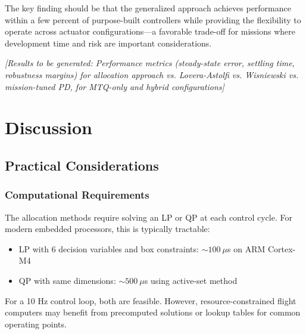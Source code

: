 \documentclass[conference]{IEEEtran}
\begin{document}
The key finding should be that the generalized approach achieves performance within a few percent of purpose-built controllers while providing the flexibility to operate across actuator configurations---a favorable trade-off for missions where development time and risk are important considerations.

\emph{[Results to be generated: Performance metrics (steady-state error, settling time, robustness margins) for allocation approach vs. Lovera-Astolfi vs. Wisniewski vs. mission-tuned PD, for MTQ-only and hybrid configurations]}

\section{Discussion}\label{sec:discussion}

\subsection{Practical Considerations}

\subsubsection{Computational Requirements}
The allocation methods require solving an LP or QP at each control cycle. For modern embedded processors, this is typically tractable:
\begin{itemize}
    \item LP with 6 decision variables and box constraints: $\sim 100~\mu$s on ARM Cortex-M4
    \item QP with same dimensions: $\sim 500~\mu$s using active-set method
\end{itemize}
For a 10 Hz control loop, both are feasible. However, resource-constrained flight computers may benefit from precomputed solutions or lookup tables for common operating points.
\end{document}
